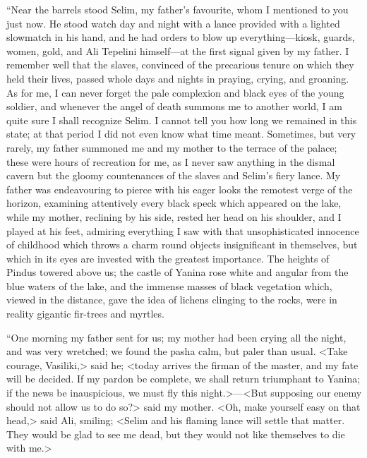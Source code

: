  “Near the barrels stood Selim, my father's favourite, whom I mentioned to you just now. He stood watch day and night with a lance provided with a lighted slowmatch in his hand, and he had orders to blow up everything—kiosk, guards, women, gold, and Ali Tepelini himself—at the first signal given by my father. I remember well that the slaves, convinced of the precarious tenure on which they held their lives, passed whole days and nights in praying, crying, and groaning. As for me, I can never forget the pale complexion and black eyes of the young soldier, and whenever the angel of death summons me to another world, I am quite sure I shall recognize Selim. I cannot tell you how long we remained in this state; at that period I did not even know what time meant. Sometimes, but very rarely, my father summoned me and my mother to the terrace of the palace; these were hours of recreation for me, as I never saw anything in the dismal cavern but the gloomy countenances of the slaves and Selim's fiery lance. My father was endeavouring to pierce with his eager looks the remotest verge of the horizon, examining attentively every black speck which appeared on the lake, while my mother, reclining by his side, rested her head on his shoulder, and I played at his feet, admiring everything I saw with that unsophisticated innocence of childhood which throws a charm round objects insignificant in themselves, but which in its eyes are invested with the greatest importance. The heights of Pindus towered above us; the castle of Yanina rose white and angular from the blue waters of the lake, and the immense masses of black vegetation which, viewed in the distance, gave the idea of lichens clinging to the rocks, were in reality gigantic fir-trees and myrtles. 

 “One morning my father sent for us; my mother had been crying all the night, and was very wretched; we found the pasha calm, but paler than usual. <Take courage, Vasiliki,> said he; <today arrives the firman of the master, and my fate will be decided. If my pardon be complete, we shall return triumphant to Yanina; if the news be inauspicious, we must fly this night.>—<But supposing our enemy should not allow us to do so?> said my mother. <Oh, make yourself easy on that head,> said Ali, smiling; <Selim and his flaming lance will settle that matter. They would be glad to see me dead, but they would not like themselves to die with me.> 

